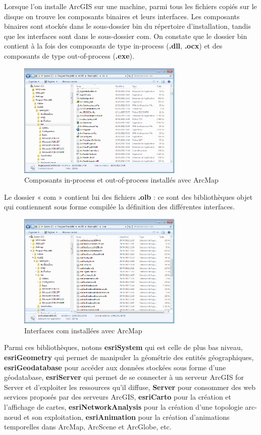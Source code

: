 \documentclass[11pt]{article}
\begin{document}
Lorsque l'on installe ArcGIS sur une machine, parmi tous les fichiers copiés sur le disque on trouve les composants binaires et leurs interfaces. Les composants binaires sont stockés dans le sous-dossier bin du répertoire d'installation, tandis que les interfaces sont dans le sous-dossier com.
On constate que le dossier bin contient à la fois des composants de type in-process (\textbf{.dll}, \textbf{.ocx}) et des composants de type out-of-process (\textbf{.exe}).

\begin{figure}[H]
	\center \includegraphics[width=0.70\textwidth]{img/cours/bin_arcgis.png}
	\caption{Composants in-process et out-of-process installés avec ArcMap}
\end{figure}

Le dossier « com » contient lui des fichiers \textbf{.olb} : ce sont des bibliothèques objet qui contiennent sous forme compilée la définition des différentes interfaces.

\begin{figure}[H]
	\center \includegraphics[width=0.70\textwidth]{img/cours/com_arcgis.png}
	\caption{Interfaces com installées avec ArcMap}
\end{figure}

Parmi ces bibliothèques, notons \textbf{esriSystem} qui est celle de plus bas niveau, \textbf{esriGeometry} qui permet de manipuler la géométrie des entités géographiques, \textbf{esriGeodatabase} pour accéder aux données stockées sous forme d’une géodatabase, \textbf{esriServer} qui permet de se connecter à un serveur ArcGIS for Server et d’exploiter les ressources qu’il diffuse, \textbf{Server} pour consommer des web services proposés par des serveurs ArcGIS, \textbf{esriCarto} pour la création et l’affichage de cartes, \textbf{esriNetworkAnalysis} pour la création d’une topologie arc-nœud et son exploitation, \textbf{esriAnimation} pour la création d’animations temporelles dans ArcMap, ArcScene et ArcGlobe, etc.
\end{document}
